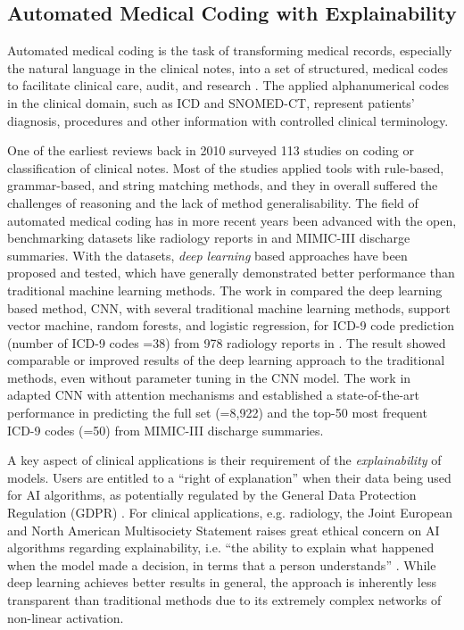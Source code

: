 \documentclass[final,5p,times,twocolumn]{elsarticle}
\begin{document}
\subsection{Automated Medical Coding with Explainability}
\label{rw:medical_coding}
Automated medical coding is the task of transforming medical records, especially the natural language in the clinical notes, into a set of structured, medical codes to facilitate clinical care, audit, and research \cite{stanfill_systematic_2010}. The applied alphanumerical codes in the clinical domain, such as ICD and SNOMED-CT, represent patients' diagnosis, procedures and other information with controlled clinical terminology.

One of the earliest reviews back in 2010 \cite{stanfill_systematic_2010} surveyed 113 studies on coding or classification of clinical notes. Most of the studies applied tools with rule-based, grammar-based, and string matching methods, and they in overall suffered the challenges of reasoning and the lack of method generalisability. The field of automated medical coding has in more recent years been advanced with the open, benchmarking datasets like radiology reports in \cite{pestian2007} and MIMIC-III \cite{johnson_mimic-iii_2016} discharge summaries. With the datasets, \textit{deep learning} based approaches have been proposed and tested, which have generally demonstrated better performance than traditional machine learning methods. The work in \cite{karimi-etal-2017-automatic} compared the deep learning based method, CNN, with several traditional machine learning methods, support vector machine, random forests, and logistic regression, for ICD-9 code prediction (number of ICD-9 codes =38) from 978 radiology reports in \cite{pestian2007}. The result showed comparable or improved results of the deep learning approach to the traditional methods, even without parameter tuning in the CNN model. The work in \cite{mullenbach-etal-2018-explainable} adapted CNN with attention mechanisms and established a state-of-the-art performance in predicting the full set (=8,922) and the top-50 most frequent ICD-9 codes (=50) from MIMIC-III discharge summaries.

A key aspect of clinical applications is their requirement of the \textit{explainability} of models. Users are entitled to a ``right of explanation'' when their data being used for AI algorithms, as potentially regulated by the General Data Protection Regulation (GDPR) \cite{goodman2017european}. For clinical applications, e.g. radiology, the Joint European and North American Multisociety Statement raises great ethical concern on AI algorithms regarding explainability, i.e. ``the ability to explain what happened when the model made a decision, in terms that a person understands'' \cite[p.~438]{geis2019ethics}. While deep learning achieves better results in general, the approach is inherently less transparent than traditional methods due to its extremely complex networks of non-linear activation.
\end{document}
